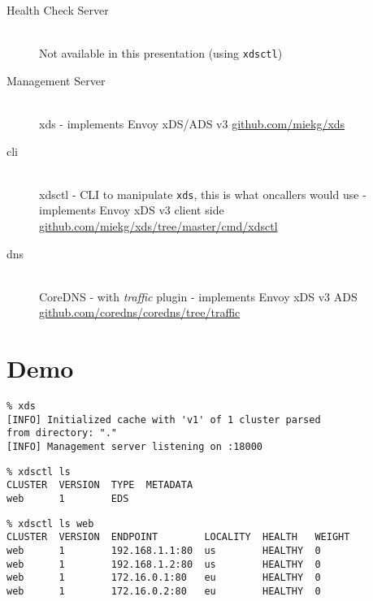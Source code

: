 \documentclass[aspectratio=169]{beamer}
\begin{document}
    \begin{frame}{}
        \begin{description}
            \item[Health Check Server]\ \\
                 Not available in this presentation (using \texttt{xdsctl})
            \item[Management Server]\ \\
                 xds - implements Envoy xDS/ADS v3 \url{github.com/miekg/xds}
            \item[cli]\ \\
                 xdsctl - CLI to manipulate \texttt{xds}, this is what oncallers would use -
                 implements Envoy xDS v3 client side \url{github.com/miekg/xds/tree/master/cmd/xdsctl}
            \item[dns]\ \\
                 CoreDNS - with \emph{traffic} plugin -
                 implements Envoy xDS v3 ADS \url{github.com/coredns/coredns/tree/traffic}
        \end{description}
    \end{frame}

    \section{Demo}
    \begin{frame}[fragile]
        \begin{verbatim}
% xds
[INFO] Initialized cache with 'v1' of 1 cluster parsed
from directory: "."
[INFO] Management server listening on :18000
        \end{verbatim}

        \begin{verbatim}
% xdsctl ls
CLUSTER  VERSION  TYPE  METADATA
web      1        EDS
        \end{verbatim}
    \end{frame}

    \begin{frame}[fragile]
        \begin{verbatim}
% xdsctl ls web
CLUSTER  VERSION  ENDPOINT        LOCALITY  HEALTH   WEIGHT
web      1        192.168.1.1:80  us        HEALTHY  0
web      1        192.168.1.2:80  us        HEALTHY  0
web      1        172.16.0.1:80   eu        HEALTHY  0
web      1        172.16.0.2:80   eu        HEALTHY  0
        \end{verbatim}

    \end{frame}
\end{document}
